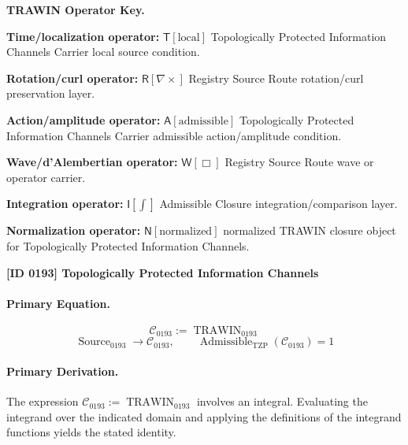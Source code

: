\par\vspace{0.45\baselineskip}
\noindent\begin{minipage}[t]{\linewidth}
\begingroup
\small
\raggedright
\textbf{TRAWIN Operator Key.}\par
\noindent\textbf{Time/localization operator:} $\mathsf{T}\!\left[\mathrm{local}\right]$ Topologically Protected Information Channels Carrier local source condition.\par
\noindent\textbf{Rotation/curl operator:} $\mathsf{R}\!\left[\nabla\times\right]$ Registry Source Route rotation/curl preservation layer.\par
\noindent\textbf{Action/amplitude operator:} $\mathsf{A}\!\left[\mathrm{admissible}\right]$ Topologically Protected Information Channels Carrier admissible action/amplitude condition.\par
\noindent\textbf{Wave/d'Alembertian operator:} $\mathsf{W}\!\left[\Box\right]$ Registry Source Route wave or operator carrier.\par
\noindent\textbf{Integration operator:} $\mathsf{I}\!\left[\int\right]$ Admissible Closure integration/comparison layer.\par
\noindent\textbf{Normalization operator:} $\mathsf{N}\!\left[\mathrm{normalized}\right]$ normalized TRAWIN closure object for Topologically Protected Information Channels.\par
\endgroup
\end{minipage}

\clearpage
\noindent\textbf{[ID 0193] Topologically Protected Information Channels}\par
\vspace{0.35em}
\paragraph{Primary Equation.}
\[
\mathcal{C}_{0193} := \operatorname{TRAWIN}_{0193}
\]
\[
\operatorname{Source}_{0193}\longrightarrow \mathcal{C}_{0193},
\qquad
\operatorname{Admissible}_{\mathrm{TZP}}\!\left(\mathcal{C}_{0193}\right)=1
\]

\paragraph{Primary Derivation.}
The expression \( \mathcal{C}_{0193} := \operatorname{TRAWIN}_{0193} \) involves an integral. Evaluating the integrand over the indicated domain and applying the definitions of the integrand functions yields the stated identity.
